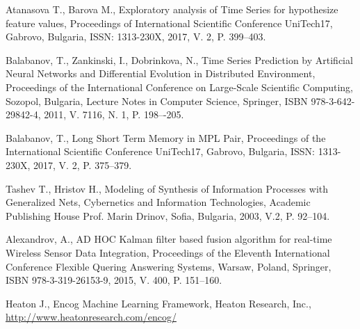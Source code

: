 \documentclass[11pt]{article}
\begin{document}
\begin{thebibliography}{99}

 Atanasova T., Barova M., Exploratory analysis of Time Series for hypothesize feature values, Proceedings of International Scientific Conference UniTech17, Gabrovo, Bulgaria, ISSN: 1313-230X, 2017, V. 2, P. 399--403.

 Balabanov, T., Zankinski, I., Dobrinkova, N., Time Series Prediction by Artificial Neural Networks and Differential Evolution in Distributed Environment, Proceedings of the International Conference on Large-Scale Scientific Computing, Sozopol, Bulgaria, Lecture Notes in Computer Science, Springer, ISBN 978-3-642-29842-4, 2011, V. 7116, N. 1, P. 198–-205. 

 Balabanov, T., Long Short Term Memory in MPL Pair, Proceedings of the  International Scientific Conference UniTech17, Gabrovo, Bulgaria, ISSN: 1313-230X, 2017, V. 2, P. 375--379.

 Tashev T., Hristov H., Modeling of Synthesis of Information Processes with Generalized Nets, Cybernetics and Information Technologies, Academic Publishing House Prof. Marin Drinov, Sofia, Bulgaria, 2003, V.2, P. 92--104.

 Alexandrov, A., AD HOC Kalman filter based fusion algorithm for real-time Wireless Sensor Data Integration, Proceedings of the Eleventh International Conference Flexible Quering Answering Systems, Warsaw, Poland, Springer, ISBN 978-3-319-26153-9, 2015, V. 400, P. 151--160.

 Heaton J., Encog Machine Learning Framework, Heaton Research, Inc., \url{http://www.heatonresearch.com/encog/}

\end{thebibliography}
\end{document}
